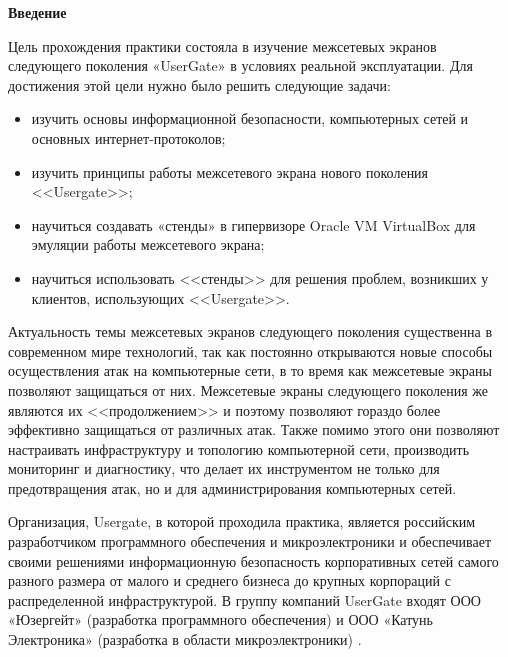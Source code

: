 \newcommand{\definition}[1]{\textbf{#1}}

\newcommand{\CLIA}{\textbf{CLI-A}}
\newcommand{\CLIB}{\textbf{CLI-B}}
\newcommand{\CLIEXT}{\textbf{CLI-EXT}}
\newcommand{\DC}{\textbf{DC}}
\newcommand{\UTM}{\textbf{UTM}}
\newcommand{\ISP}{\textbf{ISP}}

\begin{center}
	\textbf{\Large Введение}
\end{center}

Цель прохождения практики состояла в изучение межсетевых экранов следующего поколения «UserGate» в условиях реальной эксплуатации. Для достижения этой цели нужно было решить следующие задачи:
		
\begin{itemize}[nosep]
	\item изучить основы информационной безопасности, компьютерных сетей и основных интернет-протоколов;
			
	\item изучить принципы работы межсетевого экрана нового поколения <<Usergate>>;
			
	\item научиться создавать «стенды» в гипервизоре Oracle VM VirtualBox для эмуляции работы межсетевого экрана;
			
	\item научиться использовать <<стенды>> для решения проблем, возникших у клиентов, использующих <<Usergate>>.
\end{itemize}
		
Актуальность темы межсетевых экранов следующего поколения существенна в современном мире технологий, так как постоянно открываются новые способы осуществления атак на компьютерные сети, в то время как межсетевые экраны позволяют защищаться от них. Межсетевые экраны следующего поколения же являются их <<продолжением>> и поэтому позволяют гораздо более эффективно защищаться от различных атак. Также помимо этого они позволяют настраивать инфраструктуру и топологию компьютерной сети, производить мониторинг и диагностику, что делает их инструментом не только для предотвращения атак, но и для администрирования компьютерных сетей.
		
Организация, Usergate, в которой проходила практика, является российским разработчиком программного обеспечения и микроэлектроники и обеспечивает своими решениями информационную безопасность корпоративных сетей самого разного размера от малого и среднего бизнеса до крупных корпораций с распределенной инфраструктурой. В группу компаний UserGate входят ООО «Юзергейт» (разработка программного обеспечения) и ООО «Катунь Электроника» (разработка в области микроэлектроники) \cite{usergate}.		
		
